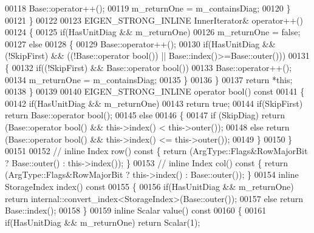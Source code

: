\begin{DoxyCode}
00118             Base::operator++();
00119           m\_returnOne = m\_containsDiag;
00120         \}
00121       \}
00122 
00123       EIGEN\_STRONG\_INLINE InnerIterator& operator++()
00124       \{
00125         \textcolor{keywordflow}{if}(HasUnitDiag && m\_returnOne)
00126           m\_returnOne = \textcolor{keyword}{false};
00127         \textcolor{keywordflow}{else}
00128         \{
00129           Base::operator++();
00130           \textcolor{keywordflow}{if}(HasUnitDiag && (!SkipFirst) && ((!Base::operator \textcolor{keywordtype}{bool}()) || Base::index()>=Base::outer()))
00131           \{
00132             \textcolor{keywordflow}{if}((!SkipFirst) && Base::operator \textcolor{keywordtype}{bool}())
00133               Base::operator++();
00134             m\_returnOne = m\_containsDiag;
00135           \}
00136         \}
00137         \textcolor{keywordflow}{return} *\textcolor{keyword}{this};
00138       \}
00139       
00140       EIGEN\_STRONG\_INLINE \textcolor{keyword}{operator} bool()\textcolor{keyword}{ const}
00141 \textcolor{keyword}{      }\{
00142         \textcolor{keywordflow}{if}(HasUnitDiag && m\_returnOne)
00143           \textcolor{keywordflow}{return} \textcolor{keyword}{true};
00144         \textcolor{keywordflow}{if}(SkipFirst) \textcolor{keywordflow}{return}  Base::operator bool();
00145         \textcolor{keywordflow}{else}
00146         \{
00147           \textcolor{keywordflow}{if} (SkipDiag) \textcolor{keywordflow}{return} (Base::operator \textcolor{keywordtype}{bool}() && this->index() < this->outer());
00148           \textcolor{keywordflow}{else} \textcolor{keywordflow}{return} (Base::operator \textcolor{keywordtype}{bool}() && this->index() <= this->outer());
00149         \}
00150       \}
00151 
00152 \textcolor{comment}{//       inline Index row() const \{ return (ArgType::Flags&RowMajorBit ? Base::outer() : this->index()); \}}
00153 \textcolor{comment}{//       inline Index col() const \{ return (ArgType::Flags&RowMajorBit ? this->index() : Base::outer()); \}}
00154       \textcolor{keyword}{inline} StorageIndex index()\textcolor{keyword}{ const}
00155 \textcolor{keyword}{      }\{
00156         \textcolor{keywordflow}{if}(HasUnitDiag && m\_returnOne)  \textcolor{keywordflow}{return} internal::convert\_index<StorageIndex>(Base::outer());
00157         \textcolor{keywordflow}{else}                            \textcolor{keywordflow}{return} Base::index();
00158       \}
00159       \textcolor{keyword}{inline} Scalar value()\textcolor{keyword}{ const}
00160 \textcolor{keyword}{      }\{
00161         \textcolor{keywordflow}{if}(HasUnitDiag && m\_returnOne)  \textcolor{keywordflow}{return} Scalar(1);

\end{DoxyCode}
